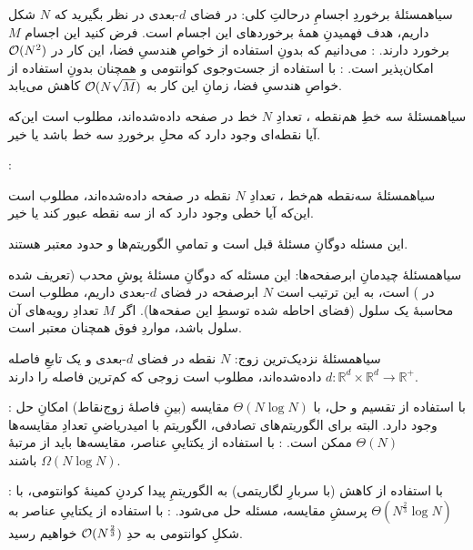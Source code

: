     ‌سیاه{مسئلهٔ برخوردِ اجسامِ درحالتِ کلی}:
     در فضای $d$-بعدی در نظر بگیرید که $N$ شکل داریم، هدف فهمیدنِ همهٔ برخوردهای این اجسام است. فرض کنید این اجسام $M$ برخورد دارند. 
        : می‌دانیم که بدونِ استفاده از خواصِ هندسیِ فضا، این کار در 
        $\mathcal{O}(N^2)$
        امکان‌پذیر است.
        : با استفاده از جست‌وجوی کوانتومی و همچنان بدونِ استفاده از خواصِ هندسیِ فضا، زمانِ این کار به 
        $\mathcal{O}(N\sqrt{M})$
        کاهش می‌یابد.

    ‌سیاه{مسئلهٔ سه خطِ هم‌نقطه}  ، تعدادِ $N$ خط در صفحه داده‌شده‌اند، مطلوب است این‌که آیا نقطه‌ای وجود دارد که محلِ برخوردِ سه خط باشد یا خیر.


    :
    
    ‌سیاه{مسئلهٔ سه‌نقطه هم‌خط}  ، تعدادِ $N$ نقطه در صفحه داده‌شده‌اند، مطلوب است این‌که آیا خطی وجود دارد که از سه نقطه عبور کند یا خیر.

این مسئله دوگانِ مسئلهٔ قبل است و تمامیِ الگوریتم‌ها و حدود معتبر هستند.

    ‌سیاه{مسئلهٔ چیدمانِ ابرصفحه‌ها}:
     این مسئله که دوگانِ مسئلهٔ پوشِ محدب (تعریف شده در ) است، به این ترتیب است $N$ ابرصفحه در فضای $d$-بعدی داریم، مطلوب است محاسبهٔ یک سلول (فضای احاطه شده توسطِ این صفحه‌ها).
    اگر $M$ تعدادِ رویه‌های آن سلول باشد، مواردِ فوق همچنان معتبر است.  
    

    ‌سیاه{مسئلهٔ نزدیک‌ترین زوج}: 
    \(N\)
    نقطه در فضای \(d\)-بعدی و یک تابعِ فاصله 
    \(d: \mathbb{R}^d \times \mathbb{R}^d \to \mathbb{R}^+\)
    داده‌شده‌اند، مطلوب است زوجی که کم‌ترین فاصله را دارند. 

        : با استفاده از تقسیم و حل، با 
        $\Theta(N \log N)$ 
        مقایسه (بینِ فاصلهٔ زوج‌نقاط)
        امکانِ حل وجود دارد.
        البته برای الگوریتم‌های تصادفی، الگوریتم با امیدریاضیِ تعدادِ مقایسه‌ها
        $\Theta(N)$
        ممکن است.
        : با استفاده از یکتاییِ عناصر، مقایسه‌ها باید از مرتبهٔ
        $\Omega(N \log N)$
        باشند.

        : با استفاده از کاهش (با سربارِ لگاریتمی) به الگوریتمِ پیدا کردنِ کمینهٔ کوانتومی، با
        $\Theta(N^{\frac{2}{3}} \log N)$
        پرسشِ مقایسه، مسئله حل می‌شود.
        : با استفاده از یکتاییِ عناصر به شکلِ کوانتومی به حدِ
        $\mathcal{O}(N^{\frac{2}{3}})$
        خواهیم رسید.

